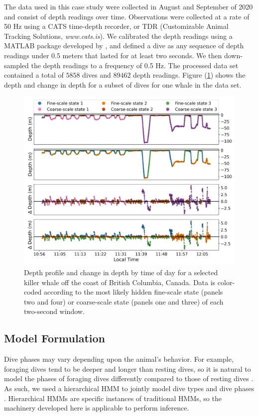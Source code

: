 The data used in this case study were collected in August and September of 2020 and consist of depth readings over time. Observations were collected at a rate of 50 Hz using a CATS time-depth recorder, or TDR (Customizable Animal Tracking Solutions, {\em{www.cats.is}}). We calibrated the depth readings using a MATLAB package developed by \citet{Cade:2021}, and defined a dive as any sequence of depth readings under 0.5 meters that lasted for at least two seconds. We then down-sampled the depth readings to a frequency of 0.5 Hz. The processed data set contained a total of $5858$ dives and $89462$ depth readings. Figure (\ref{fig:data}) shows the depth and change in depth for a subset of dives for one whale in the data set. 
%
\begin{figure}
    \centering
    \includegraphics[width=5in]{plt/decoded_dives_kw_I107_K_3_3_nWhales_8.png}
    \caption{Depth profile and change in depth by time of day for a selected killer whale off the coast of British Columbia, Canada. Data is color-coded according to the most likely hidden fine-scale state (panels two and four) or coarse-scale state (panels one and three) of each two-second window.}
    \label{fig:data}
\end{figure}
%
\subsection{Model Formulation}

Dive phases may vary depending upon the animal's behavior. For example, foraging dives tend to be deeper and longer than resting dives, so it is natural to model the phases of foraging dives differently compared to those of resting dives \citep{Tennessen:2019b}. As such, we used a hierarchical HMM to jointly model dive types and dive phases \citep{Barajas:2017}. Hierarchical HMMs are specific instances of traditional HMMs, so the machinery developed here is applicable to perform inference. 

